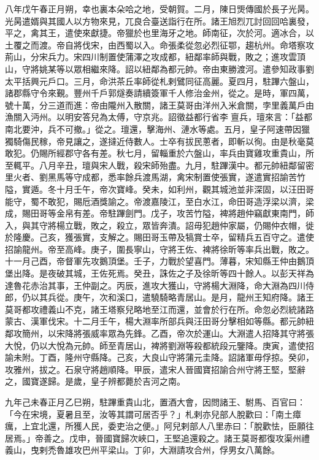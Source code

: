 \begin{pinyinscope}
 八年戊午春正月朔，幸也裏本朵哈之地，受朝賀。二月，陳日煚傳國於長子光昺。光昺遣婿與其國人以方物來見，兀良合臺送詣行在所。諸王旭烈兀討回回哈裏發，平之，禽其王，遣使來獻捷。帝獵於也里海牙之地。師南征，次於河。適冰合，以土覆之而渡。帝自將伐宋，由西蜀以入。命張柔從忽必烈征鄂，趨杭州。命塔察攻荊山，分宋兵力。宋四川制置使蒲澤之攻成都，紐鄰率師與戰，敗之；進攻雲頂山，守將姚某等以眾相繼來降。詔以紐鄰為都元帥。帝由東勝渡河。遣參知政事劉太平括興元戶口。三月，命洪茶丘率師從札剌鷿同征高麗。夏四月，駐蹕六盤山，諸郡縣守令來覲。豐州千戶郭燧奏請續簽軍千人修治金州，從之。是時，軍四萬，號十萬，分三道而進：帝由隴州入散關，諸王莫哥由洋州入米倉關，孛里義萬戶由漁關入沔州。以明安答兒為太傅，守京兆。詔徵益都行省李亶兵，璮來言：「益都南北要沖，兵不可撤。」從之。璮還，擊海州、漣水等處。五月，皇子阿速帶因獵獨騎傷民稼，帝見讓之，遂撻近侍數人。士卒有拔民蔥者，即斬以徇。由是秋毫莫敢犯。仍賜所經郡守各有差。秋七月，留輜重於六盤山，率兵由寶雞攻重貴山，所至輒平。八月辛丑，璮與宋人戰，殺宋師殆盡。九月，駐蹕漢中。都元帥紐鄰留密里火者、劉黑馬等守成都，悉率餘兵渡馬湖，禽宋制置使張實，遂遣實招諭苦竹隘，實遁。冬十月壬午，帝次寶峰。癸未，如利州，觀其城池並非深固，以汪田哥能守，蜀不敢犯，賜卮酒獎諭之。帝渡嘉陵江，至白水江，命田哥造浮梁以濟，梁成，賜田哥等金帛有差。帝駐蹕劍門。戊子，攻苦竹隘，裨將趙仲竊獻東南門，師入，與其守將楊立戰，敗之，殺立，眾皆奔潰。詔毋犯趙仲家屬，仍賜仲衣帽，徙於隆慶。己亥，獲張實，支解之。賜田哥玉帶及犒賞士卒，留精兵五百守之。遣使招諭龍州。帝至高峰。庚子，圍長寧山，守將王佐、裨將徐昕等率兵出戰，敗之。十一月己酉，帝督軍先攻鵝頂堡。壬子，力戰於望喜門。薄暮，宋知縣王仲由鵝頂堡出降。是夜破其城，王佐死焉。癸丑，誅佐之子及徐昕等四十餘人。以彭天祥為達魯花赤治其事，王仲副之。丙辰，進攻大獲山，守將楊大淵降，命大淵為四川侍郎，仍以其兵從。庚午，次和溪口，遣驍騎略青居山。是月，龍州王知府降。諸王莫哥都攻禮義山不克，諸王塔察兒略地至江而還，並會於行在所。命忽必烈統諸路蒙古、漢軍伐宋。十二月壬午，楊大淵率所部兵與汪田哥分擊相如等縣。都元帥紐鄰攻簡州，以宋降將張威率眾為先鋒。乙酉，帝次於運山。大淵遣人招降其守將張大悅，仍以大悅為元帥。師至青居山，裨將劉淵等殺都統段元鑒降。庚寅，遣使招諭未附。丁酉，隆州守縣降。己亥，大良山守將蒲元圭降。詔諸軍毋俘掠。癸卯，攻雅州，拔之。石泉守將趙順降。甲辰，遣宋人晉國寶招諭合州守將王堅，堅辭之，國寶遂歸。是歲，皇子辨都薨於吉河之南。



 九年己未春正月乙巳朔，駐蹕重貴山北，置酒大會，因問諸王、駙馬、百官曰：「今在宋境，夏暑且至，汝等其謂可居否乎？」札剌亦兒部人脫歡曰：「南土瘴癘，上宜北還，所獲人民，委吏治之便。」阿兒剌部人八里赤曰：「脫歡怯，臣願往居焉。」帝善之。戊申，晉國寶歸次峽口，王堅追還殺之。諸王莫哥都復攻渠州禮義山，曳剌禿魯雄攻巴州平梁山。丁卯，大淵請攻合州，俘男女八萬餘。




\end{pinyinscope}

